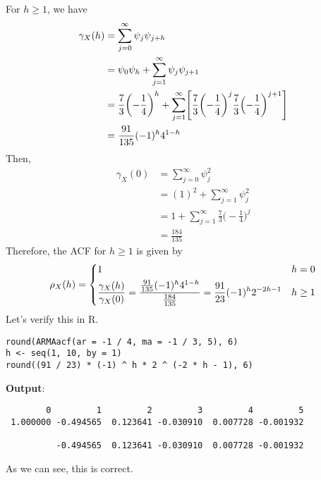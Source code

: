 \begin{Example}{}{}
    For $ h\ge 1 $, we have
    \begin{align*}
        \gamma_X(h)
         & =\sum_{j=0}^{\infty} \psi_j\psi_{j+h}                                                                               \\
         & =\psi_0\psi_h+\sum_{j=1}^{\infty}\psi_j\psi_{j+1}                                                                   \\
         & =\frac{7}{3} \biggl(-\frac{1}{4}\biggr)^{h}+
        \sum_{j=1}^{\infty} \Biggl[\frac{7}{3}\biggl(-\frac{1}{4}\biggr)^{j}\frac{7}{3}\Bigl(-\frac{1}{4} \biggr)^{j+1}\Biggr] \\
         & =\frac{91}{135}(-1)^h 4^{1-h}
    \end{align*}
    Then,
    \begin{align*}
        \gamma_X(0)
         & =\sum_{j=0}^{\infty} \psi_j^2                                     \\
         & =(1)^2+\sum_{j=1}^{\infty} \psi_j^2                               \\
         & =1+\sum_{j=1}^{\infty} \frac{7}{3} \biggl(-\frac{1}{4}\biggr)^{j} \\
         & =\frac{184}{135}
    \end{align*}
    Therefore, the ACF for $ h\ge 1 $ is given by
    \[ \rho_X(h)=\begin{dcases}
            1                                                                                                                   & h=0    \\
            \frac{\gamma_X(h)}{\gamma_X(0)}=\frac{\frac{91}{135}(-1)^h 4^{1-h}}{\frac{184}{135}}=\frac{91}{23} (-1)^h 2^{-2h-1} & h\ge 1
        \end{dcases}
    \]
    Let's verify this in R.
    \begin{verbatim}
round(ARMAacf(ar = -1 / 4, ma = -1 / 3, 5), 6)
h <- seq(1, 10, by = 1)
round((91 / 23) * (-1) ^ h * 2 ^ (-2 * h - 1), 6)
\end{verbatim}
    \textbf{Output}:
    \begin{verbatim}
        0         1         2         3         4         5
 1.000000 -0.494565  0.123641 -0.030910  0.007728 -0.001932

          -0.494565  0.123641 -0.030910  0.007728 -0.001932
\end{verbatim}
    As we can see, this is correct.
\end{Example}

